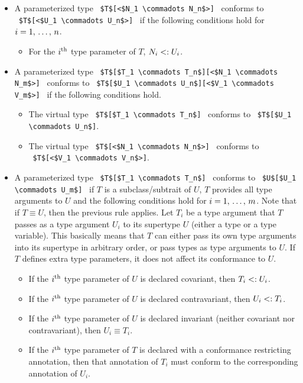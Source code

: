 \begin{itemize}
\item
A parameterized type ~\lstinline!$T$[<$N_1 \commadots N_n$>]!~ conforms to ~\lstinline!$T$[<$U_1 \commadots U_n$>]!~ if the following conditions hold for $i = 1 ,\, \ldots ,\, n$.
\begin{itemize}
\item For the $i^{\mbox{\scriptsize th}}$ type parameter of $T$, $N_i <: U_i$.
\end{itemize}

\item
A parameterized type ~\lstinline!$T$[$T_1 \commadots T_n$][<$N_1 \commadots N_m$>]!~ conforms to ~\lstinline!$T$[$U_1 \commadots U_n$][<$V_1 \commadots V_m$>]!~ if the following conditions hold.
\begin{itemize}
\item The virtual type ~\lstinline!$T$[$T_1 \commadots T_n$]!~ conforms to ~\lstinline!$T$[$U_1 \commadots U_n$]!. 
\item The virtual type ~\lstinline!$T$[<$N_1 \commadots N_n$>]!~ conforms to ~\lstinline!$T$[<$V_1 \commadots V_n$>]!. 
\end{itemize}

\item
A parameterized type ~\lstinline!$T$[$T_1 \commadots T_n$]!~ conforms to ~\lstinline!$U$[$U_1 \commadots U_m$]!~ if $T$ is a subclass/subtrait of $U$, $T$ provides all type arguments to $U$ and the following conditions hold for $i = 1 ,\, \ldots ,\, m$. Note that if $T \equiv U$, then the previous rule applies. Let $T_i$ be a type argument that $T$ passes as a type argument $U_i$ to its supertype $U$ (either a type or a type variable). This basically means that $T$ can either pass its own type arguments into its supertype in arbitrary order, or pass types as type arguments to $U$. If $T$ defines extra type parameters, it does not affect its conformance to $U$. 
\begin{itemize}
\item If the $i^{\mbox{\scriptsize th}}$ type parameter of $U$ is declared covariant, then $T_i <: U_i$.
\item If the $i^{\mbox{\scriptsize th}}$ type parameter of $U$ is declared contravariant, then $U_i <: T_i$.
\item If the $i^{\mbox{\scriptsize th}}$ type parameter of $U$ is declared invariant (neither covariant nor contravariant), then $U_i \equiv T_i$.
\item If the $i^{\mbox{\scriptsize th}}$ type parameter of $T$ is declared with a conformance restricting annotation, then that annotation of $T_i$ must conform to the corresponding annotation of $U_i$. 
\end{itemize}


\end{itemize}
